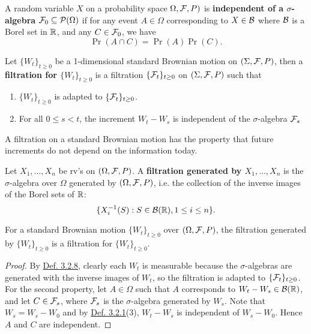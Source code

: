 \documentclass[11pt,fleqn]{book} %
\begin{document}
\begin{definition} \label{def:325}
A random variable \(X\) on a probability space \(\Omega, \mathcal{F}, P)\) is \textbf{independent of a \(\sigma\)-algebra} \(\mathcal{F}_0 \subseteq \mathcal{P}(\Omega)\) if for any event \(A \in \Omega\) corresponding to \(X \in \mathcal{B}\) where \(\mathcal{B}\) is a Borel set in \(\mathbb{R}\), and any \(C \in \mathcal{F}_0\), we have
\[
\Pr(A \cap C) = \Pr(A)\Pr(C).
\]
\end{definition}

\begin{definition} \label{def:326}
Let \(\{W_t\}_{t \geq 0}\) be a 1-dimensional standard Brownian motion on \((\Sigma, \mathcal{F}, P)\), then a \textbf{filtration for \(\{W_t\}_{t \geq 0}\)} is a filtration \(\{\mathcal{F}_t\}_{t \geq 0}\) on \((\Sigma, \mathcal{F}, P)\) such that
\begin{enumerate}
    \item \(\{W_t\}_{t\geq0}\) is adapted to \(\{\mathcal{F}_t\}_{t\geq0}\).
    \item For all \(0 \leq s < t\), the increment \(W_t - W_s\) is independent of the \(\sigma\)-algebra \(\mathcal{F}_s\)
\end{enumerate}
\end{definition}

\begin{remark} \label{rmk:327}
A filtration on a standard Brownian motion has the property that future increments do not depend on the information today.
\end{remark}

\begin{definition} \label{def:328}
Let \(X_1, \ldots, X_n\) be rv's on \((\Omega, \mathcal{F}, P)\). A \textbf{filtration generated by \(X_1, \ldots, X_n\)} is the \(\sigma\)-algebra over \(\Omega\) generated by \((\Omega, \mathcal{F}, P)\), i.e. the collection of the inverse images of the Borel sets of \(\mathbb{R}\):
\[
\{X_i^{-1}(S): S \in \mathcal{B}(\mathbb{R}), 1 \leq i \leq n\}.
\]
\end{definition}

\begin{definition} \label{def:329}
For a standard Brownian motion \(\{W_t\}_{t \geq 0}\) over \((\Omega, \mathcal{F}, P)\), the filtration generated by \(\{W_t\}_{t\geq0}\) is a filtration for \(\{W_t\}_{t\geq0}\).
\end{definition}
\begin{proof}
By \hyperref[def:328]{Def. 3.2.8}, clearly each \(W_t\) is measurable because the \(\sigma\)-algebras are generated with the inverse images of \(W_t\), so the filtration is adapted to \(\{\mathcal{F}_t\}_{t\geq0}\). \\
\indent For the second property, let \(A \in \Omega\) such that \(A\) corresponds to \(W_t - W_s \in \mathcal{B}(\mathbb{R})\), and let \(C \in \mathcal{F}_s\), where \(\mathcal{F}_s\) is the \(\sigma\)-algebra generated by \(W_s\). Note that \(W_s = W_s - W_0\) and by \hyperref[def:321]{Def. 3.2.1}(3), \(W_t - W_s\) is independent of \(W_s - W_0\). Hence \(A\) and \(C\) are independent.
\end{proof}
\end{document}
